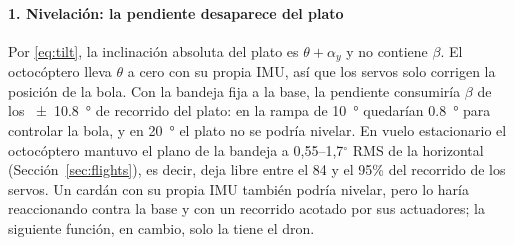 \paragraph{1. Nivelación: la pendiente desaparece del plato}
Por \eqref{eq:tilt}, la inclinación absoluta del plato es $\theta+\alpha_y$ y no contiene $\beta$. El octocóptero lleva $\theta$ a cero con su propia IMU, así que los servos solo corrigen la posición de la bola. Con la bandeja fija a la base, la pendiente consumiría $\beta$ de los \SI{\pm10.8}{\degree} de recorrido del plato: en la rampa de \SI{10}{\degree} quedarían \SI{0.8}{\degree} para controlar la bola, y en \SI{20}{\degree} el plato no se podría nivelar. En vuelo estacionario el octocóptero mantuvo el plano de la bandeja a 0,55--1,7$^\circ$ RMS de la horizontal (Sección~\ref{sec:flights}), es decir, deja libre entre el 84 y el 95\% del recorrido de los servos. Un cardán con su propia IMU también podría nivelar, pero lo haría reaccionando contra la base y con un recorrido acotado por sus actuadores; la siguiente función, en cambio, solo la tiene el dron.

